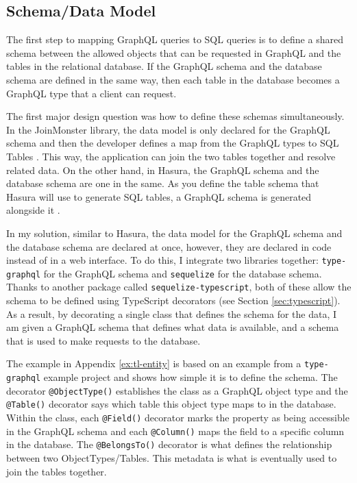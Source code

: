\subsection{Schema/Data Model}\label{sec:schema}

The first step to mapping GraphQL queries to SQL queries is to define a shared schema between the allowed objects that can be requested in GraphQL and the tables in the relational database.  If the GraphQL schema and the database schema are defined in the same way, then each table in the database becomes a GraphQL type that a client can request.

The first major design question was how to define these schemas simultaneously.  In the JoinMonster library, the data model is only declared for the GraphQL schema and then the developer defines a map from the GraphQL types to SQL Tables \cite{carlJoinMonster}.  This way, the application can join the two tables together and resolve related data.  On the other hand, in Hasura, the GraphQL schema and the database schema are one in the same.  As you define the table schema that Hasura will use to generate SQL tables, a GraphQL schema is generated alongside it \cite{hasurainc.HasuraGraphQLEngine}.

In my solution, similar to Hasura, the data model for the GraphQL schema and the database schema are declared at once, however, they are declared in code instead of in a web interface.  To do this, I integrate two libraries together: \Verb!type-graphql! for the GraphQL schema and \Verb!sequelize! for the database schema.  Thanks to another package called \Verb!sequelize-typescript!, both of these allow the schema to be defined using TypeScript decorators (see Section \ref{sec:typescript}).  As a result, by decorating a single class that defines the schema for the data, I am given a GraphQL schema that defines what data is available, and a schema that is used to make requests to the database.

The example in Appendix \ref{ex:tl-entity} is based on an example from a \Verb!type-graphql! example project and shows how simple it is to define the schema.  The decorator \Verb!@ObjectType()! establishes the class as a GraphQL object type and the \Verb!@Table()! decorator says which table this object type maps to in the database.  Within the class, each \Verb!@Field()! decorator marks the property as being accessible in the GraphQL schema and each \Verb!@Column()! maps the field to a specific column in the database.  The \Verb!@BelongsTo()! decorator is what defines the relationship between two ObjectTypes/Tables.  This metadata is what is eventually used to join the tables together.